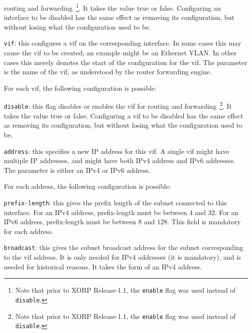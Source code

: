 \begin{description}
\begin{description}
  routing and forwarding~\footnote{Note
  that prior to XORP Release-1.1, the {\tt enable} flag was used instead of
  {\tt disable}.}.  It takes the value {\stt true} or {\stt
  false}.  Configuring an interface to be disabled has the same effect
  as removing its configuration, but without losing what the
  configuration used to be.
\item{\tt vif}: this configures a vif on the corresponding interface.
  In some cases this may cause the vif to be created; an example
  might be an Ethernet VLAN.  In other cases this merely denotes the
  start of the configuration for the vif.  The parameter is the name
  of the vif, as understood by the router forwarding engine.

  For each vif, the following configuration is possible:
\begin{description}
\item{\tt disable}: this flag disables or enables the vif for
  routing and forwarding~\footnote{Note
  that prior to XORP Release-1.1, the {\tt enable} flag was used instead of
  {\tt disable}.}.  It takes the value {\stt true} or {\stt
  false}.  Configuring a vif to be disabled has the same effect
  as removing its configuration, but without losing what the
  configuration used to be.
\item{\tt address}: this specifies a new IP address for this vif.  A
  single vif might have multiple IP addresses, and might have both IPv4
  address and IPv6 addresses.  The parameter is either an IPv4 or IPv6
  address.

  For each address, the following configuration is possible:
\begin{description}
\item{\tt prefix-length}: this gives the prefix length of the subnet
  connected to this interface.  For an IPv4 address, prefix-length
  must be between 4 and 32.  For an IPv6 address, prefix-length must
  be between 8 and 128.  This field is mandatory for each address.
\item{\tt broadcast}: this gives the subnet broadcast address for the
  subnet corresponding to the vif address.  It is only needed for IPv4
  addresses (it is mandatory), and is needed for historical reasons.
  It takes the form of an IPv4 address.


\end{description}
\end{description}
\end{description}
\end{description}
